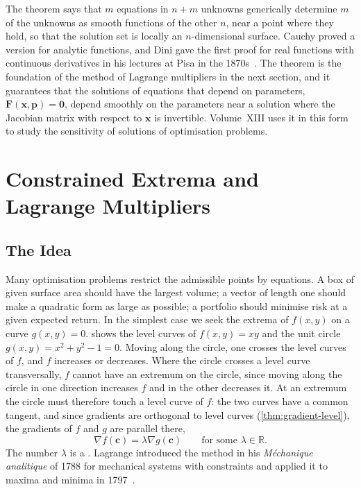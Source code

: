 The theorem says that $m$ equations in $n+m$ unknowns generically determine $m$ of the unknowns as smooth functions of the other $n$, near a point where they hold, so that the solution set is locally an $n$-dimensional surface. Cauchy proved a version for analytic functions, and Dini gave the first proof for real functions with continuous derivatives in his lectures at Pisa in the 1870s~\cite{krantz2002ift}. The theorem is the foundation of the method of Lagrange multipliers in the next section, and it guarantees that the solutions of equations that depend on parameters, $\mathbf F(\mathbf x,\mathbf p)=\mathbf0$, depend smoothly on the parameters near a solution where the Jacobian matrix with respect to $\mathbf x$ is invertible. Volume~XIII uses it in this form to study the sensitivity of solutions of optimisation problems.

\section{Constrained Extrema and Lagrange Multipliers}
\label{sec:lagrange}

\subsection{The Idea}

Many optimisation problems restrict the admissible points by equations. A box of given surface area should have the largest volume; a vector of length one should make a quadratic form as large as possible; a portfolio should minimise risk at a given expected return. In the simplest case we seek the extrema of $f(x,y)$ on a curve $g(x,y)=0$.  shows the level curves of $f(x,y)=xy$ and the unit circle $g(x,y)=x^2+y^2-1=0$. Moving along the circle, one crosses the level curves of $f$, and $f$ increases or decreases. Where the circle crosses a level curve transversally, $f$ cannot have an extremum on the circle, since moving along the circle in one direction increases $f$ and in the other decreases it. At an extremum the circle must therefore touch a level curve of $f$: the two curves have a common tangent, and since gradients are orthogonal to level curves (\cref{thm:gradient-level}), the gradients of $f$ and $g$ are parallel there,
\[
\nabla f(\mathbf c)=\lambda\nabla g(\mathbf c)\qquad\text{for some }\lambda\in\mathbb R .
\]
The number $\lambda$ is a . Lagrange introduced the method in his \emph{M\'echanique analitique} of 1788 for mechanical systems with constraints and applied it to maxima and minima in 1797~\cite{lagrange1788}\cite[pp.~190--198]{lagrange1797}.

